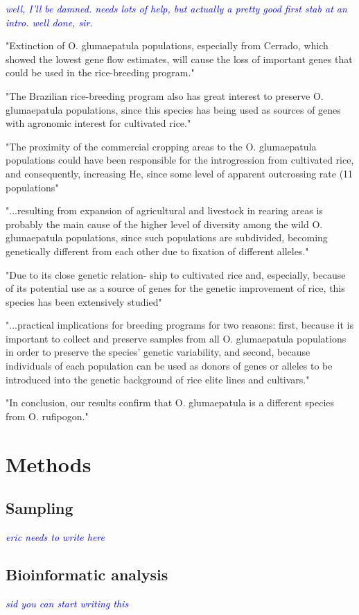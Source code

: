 \documentclass[11pt]{article} %
\newcommand{\jri}[1]{\textcolor{blue}{ \emph{\scriptsize  #1}} } %
\begin{document}
\begin{linenumbers}
\jri{well, I'll be damned. needs lots of help, but actually a pretty good first stab at an intro. well done, sir.}



"Extinction of O. glumaepatula populations, especially from Cerrado,
which showed the lowest gene flow estimates, will cause the loss of 
important genes that could be used in the rice-breeding program."
\cite{brondani2005}

"The Brazilian rice-breeding
program also has great interest to preserve
O. glumaepatula populations, since this species has
being used as sources of genes with agronomic
interest for cultivated rice."
\cite{brondani2005}

"The proximity of the
commercial cropping areas to the O. glumaepatula
populations could have been responsible for the
introgression from cultivated rice, and consequently,
increasing He, since some level of apparent
outcrossing rate (11%
populations"
\cite{brondani2005}

"...resulting from expansion of agricultural
and livestock in rearing areas is probably the
main cause of the higher level of diversity among
the wild O. glumaepatula populations, since such
populations are subdivided, becoming genetically
different from each other due to fixation of different
alleles."
\cite{brondani2005}

"Due to its close genetic relation-
ship to cultivated rice and, especially, because of its
potential use as a source of genes for the genetic
improvement of rice, this species has been extensively
studied" 
\cite{SánchezandEspinoza2003}

"...practical implications for breeding
programs for two reasons: first, because it is important to
collect and preserve samples from all
O. glumaepatula
populations in order to preserve the species’ genetic variability, 
and second, because individuals of each population
can be used as donors of genes or alleles to be introduced
into the genetic background of rice elite lines and cultivars."
\cite{deCampoVaz2009}


"In conclusion, our results
confirm that O. glumaepatula
is a different species from O. rufipogon."
\cite{SánchezandEspinoza2003}

\section*{Methods}
\subsection*{Sampling}
\jri{eric needs to write here}
\subsection*{Bioinformatic analysis}
\jri{sid you can start writing this}

\clearpage



\end{linenumbers}
\end{document}
